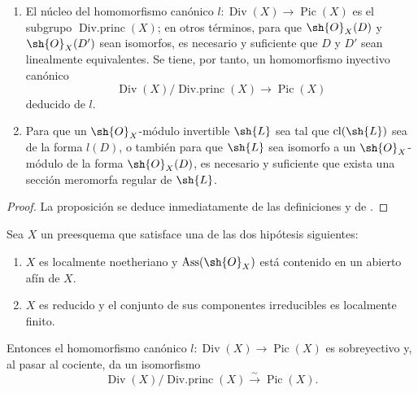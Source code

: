 \begin{proposition}[21.3.3]
\label{IV.21.3.3}
\begin{enumerate}[label=\textup{(\roman*)}]
  \item El núcleo del homomorfismo canónico $l:\operatorname{Div}(X)\to\operatorname{Pic}(X)$ es el subgrupo $\operatorname{Div.princ}(X)$; en otros términos, para que $\sh{O}_X(D)$ y $\sh{O}_X(D')$ sean isomorfos, es necesario y suficiente que $D$ y $D'$ sean linealmente equivalentes.
  Se tiene, por tanto, un homomorfismo \textup{inyectivo} canónico
  \[
  \label{IV.21.3.3.1}
    \operatorname{Div}(X)/\operatorname{Div.princ}(X)\to\operatorname{Pic}(X)
    \tag{21.3.3.1}
  \]
  deducido de $l$.
  \item Para que un $\sh{O}_X$-módulo invertible $\sh{L}$ sea tal que $\operatorname{cl}(\sh{L})$ sea de la forma $l(D)$, o también para que $\sh{L}$ sea isomorfo a un $\sh{O}_X$-módulo de la forma $\sh{O}_X(D)$, es necesario y suficiente que exista una sección meromorfa regular de $\sh{L}$.
\end{enumerate}
\end{proposition}

\begin{proof}
La proposición se deduce inmediatamente de las definiciones y de .
\end{proof}

\begin{proposition}[21.3.4]
\label{IV.21.3.4}
Sea $X$ un preesquema que satisface una de las dos hipótesis siguientes:
\begin{enumerate}[label=\emph{\alph*)}]
  \item $X$ es localmente noetheriano y $\operatorname{Ass}(\sh{O}_X)$ está contenido en un abierto afín de $X$.
  \item $X$ es reducido y el conjunto de sus componentes irreducibles es localmente finito.
\end{enumerate}
Entonces el homomorfismo canónico $l:\operatorname{Div}(X)\to\operatorname{Pic}(X)$ es sobreyectivo y, al pasar al cociente, da un isomorfismo
\[
  \operatorname{Div}(X)/\operatorname{Div.princ}(X)\xrightarrow{\sim}\operatorname{Pic}(X).
\]
\end{proposition}

